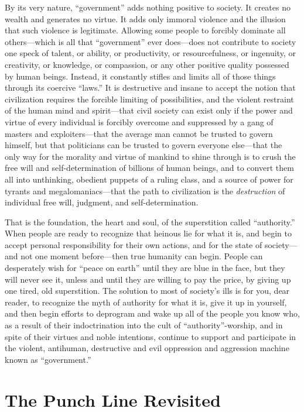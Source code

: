 \documentclass{book}
\begin{document}
By its very nature, \enquote{government} adds nothing positive to society. It creates no wealth and generates no virtue. It adds only immoral violence and the illusion that such violence is legitimate. Allowing some people to forcibly dominate all others---which is all that \enquote{government} ever does---does not contribute to society one speck of talent, or ability, or productivity, or resourcefulness, or ingenuity, or creativity, or knowledge, or compassion, or any other positive quality possessed by human beings. Instead, it constantly stifles and limits all of those things through its coercive \enquote{laws.} It is destructive and insane to accept the notion that civilization requires the forcible limiting of possibilities, and the violent restraint of the human mind and spirit---that civil society can exist only if the power and virtue of every individual is forcibly overcome and suppressed by a gang of masters and exploiters---that the average man cannot be trusted to govern himself, but that politicians can be trusted to govern everyone else---that the only way for the morality and virtue of mankind to shine through is to crush the free will and self-determination of billions of human beings, and to convert them all into unthinking, obedient puppets of a ruling class, and a source of power for tyrants and megalomaniacs---that the path to civilization is the \emph{destruction} of individual free will, judgment, and self-determination.

That is the foundation, the heart and soul, of the superstition called \enquote{authority.} When people are ready to recognize that heinous lie for what it is, and begin to accept personal responsibility for their own actions, and for the state of society---and not one moment before---then true humanity can begin. People can desperately wish for \enquote{peace on earth} until they are blue in the face, but they will never see it, unless and until they are willing to pay the price, by giving up one tired, old superstition. The solution to most of society's ills is for you, dear reader, to recognize the myth of authority for what it is, give it up in yourself, and then begin efforts to deprogram and wake up all of the people you know who, as a result of their indoctrination into the cult of \enquote{authority}-worship, and in spite of their virtues and noble intentions, continue to support and participate in the violent, antihuman, destructive and evil oppression and aggression machine known as \enquote{government.}

\section{The Punch Line Revisited}
\end{document}
